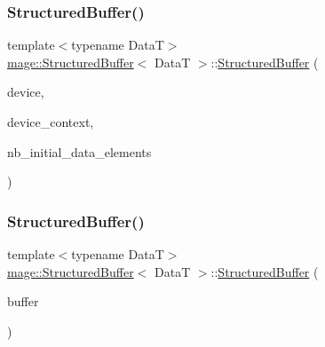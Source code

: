 \subsubsection{\texorpdfstring{Structured\+Buffer()}{StructuredBuffer()}\hspace{0.1cm}{\footnotesize\ttfamily [1/3]}}
{\footnotesize\ttfamily template$<$typename DataT$>$ \\
\hyperlink{structmage_1_1_structured_buffer}{mage\+::\+Structured\+Buffer}$<$ DataT $>$\+::\hyperlink{structmage_1_1_structured_buffer}{Structured\+Buffer} (\begin{DoxyParamCaption}\item[{I\+D3\+D11\+Device2 $\ast$}]{device,  }\item[{I\+D3\+D11\+Device\+Context2 $\ast$}]{device\+\_\+context,  }\item[{size\+\_\+t}]{nb\+\_\+initial\+\_\+data\+\_\+elements }\end{DoxyParamCaption})\hspace{0.3cm}{\ttfamily [explicit]}}

\hypertarget{structmage_1_1_structured_buffer_aa017416099a12305d0177094c768150e}{}\label{structmage_1_1_structured_buffer_aa017416099a12305d0177094c768150e} 
\subsubsection{\texorpdfstring{Structured\+Buffer()}{StructuredBuffer()}\hspace{0.1cm}{\footnotesize\ttfamily [2/3]}}
{\footnotesize\ttfamily template$<$typename DataT$>$ \\
\hyperlink{structmage_1_1_structured_buffer}{mage\+::\+Structured\+Buffer}$<$ DataT $>$\+::\hyperlink{structmage_1_1_structured_buffer}{Structured\+Buffer} (\begin{DoxyParamCaption}\item[{const \hyperlink{structmage_1_1_structured_buffer}{Structured\+Buffer}$<$ DataT $>$ \&}]{buffer }\end{DoxyParamCaption})\hspace{0.3cm}{\ttfamily [delete]}}

\hypertarget{structmage_1_1_structured_buffer_a455bd930f39f5fdf6af4f453694997da}{}\label{structmage_1_1_structured_buffer_a455bd930f39f5fdf6af4f453694997da} 
